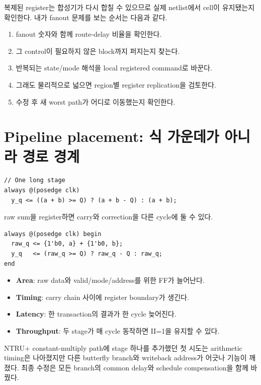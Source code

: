 복제된 register는 합성기가 다시 합칠 수 있으므로 실제 netlist에서 cell이
유지됐는지 확인한다. 내가 fanout 문제를 보는 순서는 다음과 같다.

\begin{enumerate}
  \item fanout 숫자와 함께 route-delay 비율을 확인한다.
  \item 그 control이 필요하지 않은 block까지 퍼지는지 찾는다.
  \item 반복되는 state/mode 해석을 local registered command로 바꾼다.
  \item 그래도 물리적으로 넓으면 region별 register replication을 검토한다.
  \item 수정 후 새 worst path가 어디로 이동했는지 확인한다.
\end{enumerate}

\section{Pipeline placement: 식 가운데가 아니라 경로 경계}

\begin{lstlisting}
// One long stage
always @(posedge clk)
  y_q <= ((a + b) >= Q) ? (a + b - Q) : (a + b);
\end{lstlisting}

raw sum을 register하면 carry와 correction을 다른 cycle에 둘 수 있다.

\begin{lstlisting}
always @(posedge clk) begin
  raw_q <= {1'b0, a} + {1'b0, b};
  y_q   <= (raw_q >= Q) ? raw_q - Q : raw_q;
end
\end{lstlisting}

\begin{itemize}
  \item \textbf{Area}: raw data와 valid/mode/address를 위한 FF가 늘어난다.
  \item \textbf{Timing}: carry chain 사이에 register boundary가 생긴다.
  \item \textbf{Latency}: 한 transaction의 결과가 한 cycle 늦어진다.
  \item \textbf{Throughput}: 두 stage가 매 cycle 동작하면 II=1을 유지할 수 있다.
\end{itemize}

NTRU+ constant-multiply path에 stage 하나를 추가했던 첫 시도는 arithmetic timing은
나아졌지만 다른 butterfly branch와 writeback address가 어긋나 기능이 깨졌다.
최종 수정은 모든 branch의 common delay와 schedule compensation을 함께 바꿨다.

